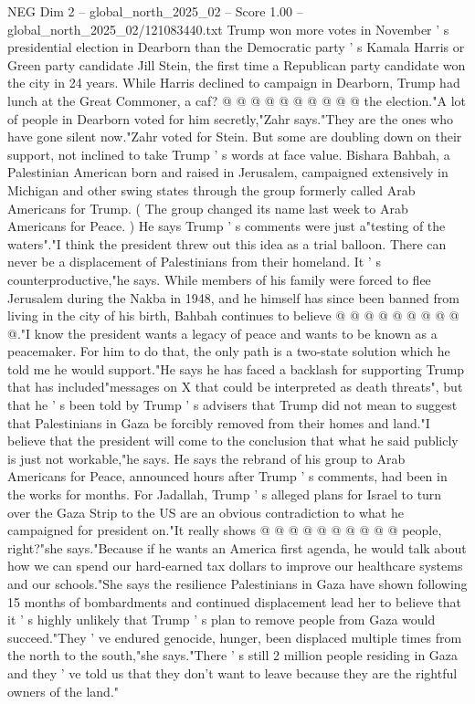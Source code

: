 \begin{textsample}{NEG Dim 2 – global\_north\_2025\_02 – Score 1.00 – global\_north\_2025\_02/121083440.txt}
Trump won more votes in November ' s presidential election in Dearborn than the Democratic party ' s Kamala Harris or Green party candidate Jill Stein, the first time a Republican party candidate won the city in 24 years.
While Harris declined to campaign in Dearborn, Trump had lunch at the Great Commoner, a caf? @ @ @ @ @ @ @ @ @ @ the election."A lot of people in Dearborn voted for him secretly,"Zahr says."They are the ones who have gone silent now."Zahr voted for Stein.
But some are doubling down on their support, not inclined to take Trump ' s words at face value.
Bishara Bahbah, a Palestinian American born and raised in Jerusalem, campaigned extensively in Michigan and other swing states through the group formerly called Arab Americans for Trump. ( The group changed its name last week to Arab Americans for Peace. ) He says Trump ' s comments were just a"testing of the waters"."I think the president threw out this idea as a trial balloon.
There can never be a displacement of Palestinians from their homeland.
It ' s counterproductive,"he says.
While members of his family were forced to flee Jerusalem during the Nakba in 1948, and he himself has since been banned from living in the city of his birth, Bahbah continues to believe @ @ @ @ @ @ @ @ @ @."I know the president wants a legacy of peace and wants to be known as a peacemaker.
For him to do that, the only path is a two-state solution which he told me he would support."He says he has faced a backlash for supporting Trump that has included"messages on X that could be interpreted as death threats", but that he ' s been told by Trump ' s advisers that Trump did not mean to suggest that Palestinians in Gaza be forcibly removed from their homes and land."I believe that the president will come to the conclusion that what he said publicly is just not workable,"he says.
He says the rebrand of his group to Arab Americans for Peace, announced hours after Trump ' s comments, had been in the works for months.
For Jadallah, Trump ' s alleged plans for Israel to turn over the Gaza Strip to the US are an obvious contradiction to what he campaigned for president on."It really shows @ @ @ @ @ @ @ @ @ @ people, right?"she says."Because if he wants an America first agenda, he would talk about how we can spend our hard-earned tax dollars to improve our healthcare systems and our schools."She says the resilience Palestinians in Gaza have shown following 15 months of bombardments and continued displacement lead her to believe that it ' s highly unlikely that Trump ' s plan to remove people from Gaza would succeed."They ' ve endured genocide, hunger, been displaced multiple times from the north to the south,"she says."There ' s still 2 million people residing in Gaza and they ' ve told us that they don't want to leave because they are the rightful owners of the land."

\end{textsample}
